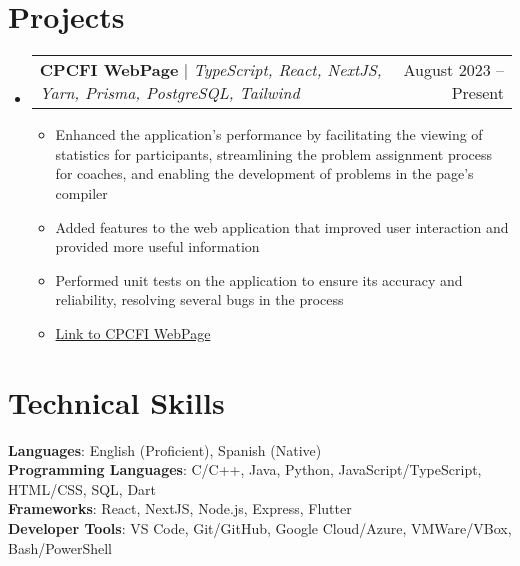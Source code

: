 \documentclass[letterpaper,11pt]{article}
\makeatletter
\newcommand{\resumeItem}[1]{
  \item\small{
    {#1 \vspace{-2pt}}
  }
}
\newcommand{\resumeProjectHeading}[2]{
    \item
    \begin{tabular*}{0.97\textwidth}{l@{\extracolsep{\fill}}r}
      \small#1 & #2 \\
    \end{tabular*}\vspace{-7pt}
}
\newcommand{\resumeSubHeadingListStart}{\begin{itemize}[leftmargin=0.15in, label={}]}
\newcommand{\resumeSubHeadingListEnd}{\end{itemize}}
\newcommand{\resumeItemListStart}{\begin{itemize}}
\newcommand{\resumeItemListEnd}{\end{itemize}\vspace{-5pt}}
\makeatother
\begin{document}
\section{Projects}
\resumeSubHeadingListStart
\resumeProjectHeading
{\textbf{CPCFI WebPage} $|$ \emph{TypeScript, React, NextJS, Yarn, Prisma, PostgreSQL, Tailwind}}{August 2023 -- Present}
\resumeItemListStart
\resumeItem {Enhanced the application's performance by facilitating the viewing of statistics for participants, streamlining the problem assignment process for coaches, and enabling the development of problems in the page's compiler}
\resumeItem {Added features to the web application that improved user interaction and provided more useful information}
\resumeItem {Performed unit tests on the application to ensure its accuracy and reliability, resolving several bugs in the process}
\resumeItem{\href{http://www.cpcfi.unam.mx:3000}{Link to CPCFI WebPage}}
\resumeItemListEnd
\resumeSubHeadingListEnd



%
\section{Technical Skills}
\begin{itemize}[leftmargin=0.15in, label={}]
  \small{\item{
        \textbf{Languages}{: English (Proficient), Spanish (Native)} \\
        \textbf{Programming Languages}{:  C/C++, Java, Python, JavaScript/TypeScript, HTML/CSS, SQL, Dart} \\
        \textbf{Frameworks}{: React, NextJS, Node.js, Express, Flutter} \\
        \textbf{Developer Tools}{: VS Code, Git/GitHub, Google Cloud/Azure, VMWare/VBox, Bash/PowerShell} \\
        }}
\end{itemize}


\end{document}
